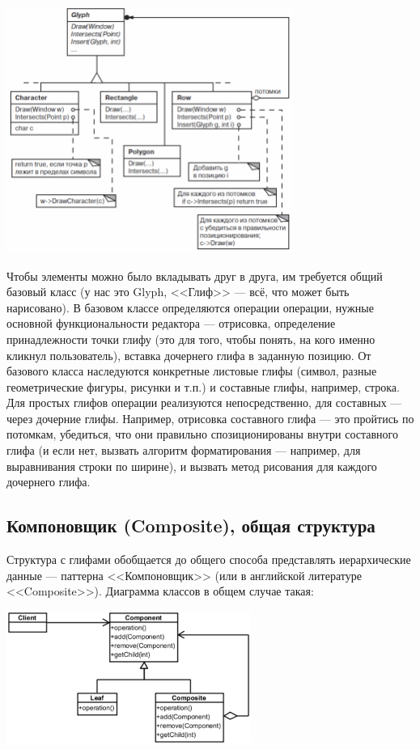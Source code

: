 \documentclass{../mcstext}
\begin{document}
\begin{center}
    \includegraphics[width=0.7\textwidth]{glyphs.png}
\end{center}

Чтобы элементы можно было вкладывать друг в друга, им требуется общий базовый класс (у нас это Glyph, <<Глиф>> --- всё, что может быть нарисовано). В базовом классе определяются операции операции, нужные основной функциональности редактора --- отрисовка, определение принадлежности точки глифу (это для того, чтобы понять, на кого именно кликнул пользователь), вставка дочернего глифа в заданную позицию. От базового класса наследуются конкретные листовые глифы (символ, разные геометрические фигуры, рисунки и т.п.) и составные глифы, например, строка. Для простых глифов операции реализуются непосредственно, для составных --- через дочерние глифы. Например, отрисовка составного глифа --- это пройтись по потомкам, убедиться, что они правильно спозиционированы внутри составного глифа (и если нет, вызвать алгоритм форматирования --- например, для выравнивания строки по ширине), и вызвать метод рисования для каждого дочернего глифа.

\subsection{Компоновщик (Composite), общая структура}

Структура с глифами обобщается до общего способа представлять иерархические данные --- паттерна <<Компоновщик>> (или в английской литературе <<Composite>>). Диаграмма классов в общем случае такая:

\begin{center}
    \includegraphics[width=0.6\textwidth]{composite.png}
\end{center}
\end{document}
